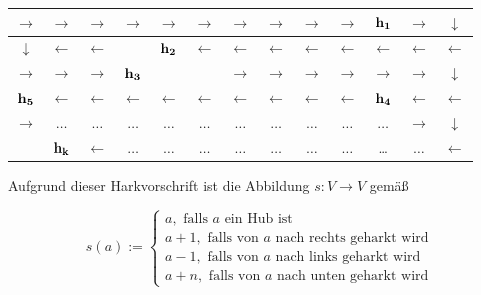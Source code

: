 \documentclass[fontsize=12pt,doubleside,openany,listof=totoc,listof=flat,listof=nochaptergap,numbers=noenddot]{scrbook}
\theoremstyle{style}
\begin{document}
\begin{center}
\begin{minipage}{\textwidth}
\renewcommand{\arraystretch}{1.5}
\begin{table}[H]
\centering 
\begin{scriptsize}
\begin{tabular}{|>{}c|>{}c|>{}c|>{}c|>{}c|>{}c|>{}c|>{}c|>{}c|>{}c|>{}c|>{}c|>{}c|}
\hline
$\rightarrow$&$\rightarrow$&$\rightarrow$&$\rightarrow$&$\rightarrow$&$\rightarrow$&$\rightarrow$&
$\rightarrow$&$\rightarrow$&$\rightarrow$&$\bf{h_1}$&$\rightarrow$&$\downarrow$\\
\hline
$\downarrow$&$\leftarrow$&$\leftarrow$&\cellcolor{gray!50!white} &$\bf{h_2}$&
$\leftarrow$&$\leftarrow$&$\leftarrow$&$\leftarrow$&$\leftarrow$&$\leftarrow$&$\leftarrow$&$\leftarrow$ \\
\hline
$\rightarrow$&$\rightarrow$&$\rightarrow$&$\bf{h_3}$&\cellcolor{gray!50!white} &\cellcolor{gray!50!white} &$\rightarrow$&$\rightarrow$&$\rightarrow$&$\rightarrow$&$\rightarrow$&$\rightarrow$&$\downarrow$ \\
\hline
$\bf{h_5}$&$\leftarrow$&$\leftarrow$&$\leftarrow$&$\leftarrow$&$\leftarrow$&$\leftarrow$&$\leftarrow$
&$\leftarrow$&$\leftarrow$&$\bf{h_4}$&$\leftarrow$&$\leftarrow$ \\
\hline
$\rightarrow$&$\dots$&$\dots$&$\dots$&$\dots$&$\dots$&$\dots$&$\dots$&$\dots$&$\dots$&$\dots$&$\rightarrow$&$\downarrow$\\
\hline
\cellcolor{gray!50!white} &$\bf{h_k}$&$\leftarrow$&$\dots$&$\dots$&$\dots$ &$\dots$&$\dots$&$\dots$&$\dots$&\dots&$\dots$&$\leftarrow$ \\
\hline
\end{tabular}
\label{Einfaches_Zickzack}
\end{scriptsize} 
\end{table}
\renewcommand{\arraystretch}{1}
\end{minipage}
\end{center}

\phantom 
\noindent Aufgrund dieser Harkvorschrift ist die Abbildung $s:V \rightarrow V$ gemäß

\begin{equation}
s(a) := 
\begin{cases} 
a, \text{ falls } a \text{ ein Hub ist}\\
a+1, \text{ falls von } a \text{ nach rechts geharkt wird}\\
a-1, \text{ falls von } a \text{ nach links geharkt wird} \\
a+n, \text{ falls von } a \text{ nach unten geharkt wird}
\end{cases}
\label{equation_Zickzack-Nachfolgerfunktion}
\end{equation} 
\end{document}
